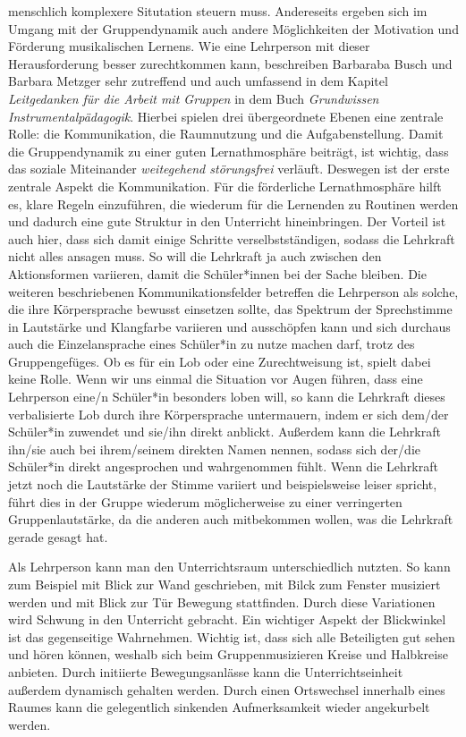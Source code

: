 menschlich komplexere Situtation steuern muss. Andereseits ergeben sich im
Umgang mit der Gruppendynamik auch andere Möglichkeiten der Motivation und
Förderung musikalischen Lernens. Wie eine Lehrperson mit dieser Herausforderung
besser zurechtkommen kann, beschreiben Barbaraba Busch und Barbara Metzger sehr
zutreffend und auch umfassend in dem Kapitel \emph{Leitgedanken für die Arbeit
mit Gruppen} in dem Buch \emph{Grundwissen Instrumentalpädagogik}. Hierbei
spielen drei übergeordnete Ebenen eine zentrale Rolle: die Kommunikation, die
Raumnutzung und die Aufgabenstellung. Damit die Gruppendynamik zu einer guten
Lernathmosphäre beiträgt, ist wichtig, dass das soziale Miteinander
\emph{weitegehend störungsfrei} verläuft. Deswegen ist der erste zentrale Aspekt
die Kommunikation. Für die förderliche Lernathmosphäre hilft es, klare Regeln
einzuführen, die wiederum für die Lernenden zu Routinen werden und dadurch eine
gute Struktur in den Unterricht hineinbringen. Der Vorteil ist auch hier, dass
sich damit einige Schritte verselbstständigen, sodass die Lehrkraft nicht alles
ansagen muss. So will die Lehrkraft ja auch zwischen den
Aktionsformen variieren, damit die Schüler*innen bei der Sache bleiben. Die weiteren
beschriebenen Kommunikationsfelder betreffen die Lehrperson als solche, die ihre
Körpersprache bewusst einsetzen sollte, das Spektrum der Sprechstimme in
Lautstärke und Klangfarbe variieren und ausschöpfen kann und sich durchaus auch
die Einzelansprache eines Schüler*in zu nutze machen darf, trotz des
Gruppengefüges. Ob es für ein Lob oder eine Zurechtweisung ist, spielt dabei
keine Rolle. Wenn wir uns einmal die Situation vor Augen führen, dass eine
Lehrperson eine/n Schüler*in besonders loben will, so kann die Lehrkraft dieses
verbalisierte Lob durch ihre Körpersprache untermauern, indem er sich dem/der
Schüler*in zuwendet und sie/ihn direkt anblickt. Außerdem kann die Lehrkraft ihn/sie
auch bei ihrem/seinem direkten Namen nennen, sodass sich der/die Schüler*in
direkt angesprochen und wahrgenommen fühlt. Wenn die Lehrkraft jetzt noch die
Lautstärke der Stimme variiert und beispielsweise leiser spricht, führt dies in
der Gruppe wiederum möglicherweise zu einer verringerten Gruppenlautstärke, da
die anderen auch mitbekommen wollen, was die Lehrkraft gerade gesagt hat. 

Als Lehrperson kann man den Unterrichtsraum unterschiedlich nutzten. So kann zum
Beispiel mit Blick zur Wand geschrieben, mit Bilck zum Fenster musiziert werden
und mit Blick zur Tür Bewegung stattfinden. Durch diese Variationen wird Schwung
in den Unterricht gebracht. Ein wichtiger Aspekt der Blickwinkel ist das
gegenseitige Wahrnehmen. Wichtig ist, dass sich alle Beteiligten gut sehen und
hören können, weshalb sich beim Gruppenmusizieren Kreise und Halbkreise
anbieten. Durch initiierte Bewegungsanlässe kann die Unterrichtseinheit außerdem
dynamisch gehalten werden. Durch einen Ortswechsel innerhalb eines Raumes kann
die gelegentlich sinkenden Aufmerksamkeit wieder angekurbelt werden. 

